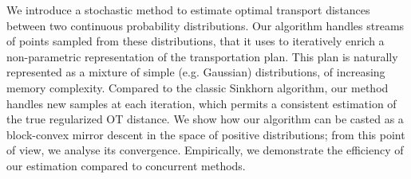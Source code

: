 We introduce a stochastic method to estimate optimal transport distances between
two continuous probability distributions. Our algorithm handles streams of
points sampled from these distributions, that it uses to iteratively enrich a
non-parametric representation of the transportation plan. This plan is naturally
represented as a mixture of simple (e.g. Gaussian) distributions, of increasing
memory complexity. Compared to the classic Sinkhorn algorithm, our method
handles new samples at each iteration, which permits a consistent estimation of
the true regularized OT distance. We show how our algorithm can be casted as a
block-convex mirror descent in the space of positive distributions; from this
point of view, we analyse its convergence. Empirically, we demonstrate the
efficiency of our estimation compared to concurrent methods.